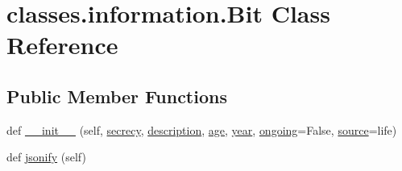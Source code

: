 \hypertarget{classclasses_1_1information_1_1Bit}{}\section{classes.\+information.\+Bit Class Reference}
\label{classclasses_1_1information_1_1Bit}
\subsection*{Public Member Functions}
\begin{DoxyCompactItemize}
\item 
def \hyperlink{classclasses_1_1information_1_1Bit_aa267109ed898fef3aae20caecf2e4c60}{\+\_\+\+\_\+init\+\_\+\+\_\+} (self, \hyperlink{classclasses_1_1information_1_1Bit_a24bd281f7d6310cfbc4f0157cbaa9b9f}{secrecy}, \hyperlink{classclasses_1_1information_1_1Bit_a9845a4a2f2ecfcf3f5782273689bc0ba}{description}, \hyperlink{classclasses_1_1information_1_1Bit_ae8321d5f425e99aef73581a796398bfb}{age}, \hyperlink{classclasses_1_1information_1_1Bit_a92eab83638def3a8c5f5fa31cd479968}{year}, \hyperlink{classclasses_1_1information_1_1Bit_a2be60978e576c8f399e5322a1c46b25d}{ongoing}=False, \hyperlink{classclasses_1_1information_1_1Bit_abe5cb2715ae2fc08dcb74e78e9c55a8c}{source}=\textquotesingle{}life\textquotesingle{})
\item 
def \hyperlink{classclasses_1_1information_1_1Bit_aecc5ee342c3f9e4a0a50e0ccf968612d}{jsonify} (self)
\end{DoxyCompactItemize}
